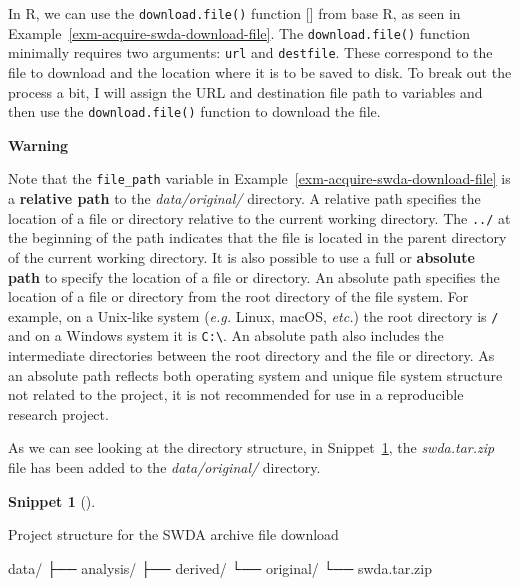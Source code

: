 \documentclass[
  letterpaper,
  krantz1]{latex/krantz-mod}
\newenvironment{Shaded}{\begin{snugshade}}{\end{snugshade}}
\newcommand{\ExtensionTok}[1]{\textcolor[rgb]{0.00,0.00,0.00}{#1}}
\newcommand{\NormalTok}[1]{\textcolor[rgb]{0.00,0.00,0.00}{#1}}
\newcommand{\cindex}[1]{%
  \StrSubstitute{#1}{_}{\_}[\temp]%
  \index{\temp}%
}
\theoremstyle{definition}
\newtheorem{definition}{Snippet}[chapter]
\theoremstyle{definition}
\theoremstyle{remark}
\begin{document}
In R, we can use the \texttt{download.file()}
function\cindex{download.file()} from base R, as seen in
Example~\ref{exm-acquire-swda-download-file}. The
\texttt{download.file()} function minimally requires two arguments:
\texttt{url} and \texttt{destfile}. These correspond to the file to
download and the location where it is to be saved to disk. To break out
the process a bit, I will assign the URL and destination file path to
variables and then use the \texttt{download.file()} function to download
the file.

\begin{tcolorbox}[enhanced jigsaw, toprule=.15mm, breakable, colback=white, arc=.35mm, left=2mm, colframe=quarto-callout-color-frame, opacityback=0, bottomrule=.15mm, rightrule=.15mm, leftrule=.75mm]

\textbf{ Warning}

Note that the \texttt{file\_path} variable in
Example~\ref{exm-acquire-swda-download-file} is a \textbf{relative
path} to the \emph{data/original/} directory. A
relative path specifies the location of a file or directory relative to
the current working directory. The \texttt{../} at the beginning of the
path indicates that the file is located in the parent directory of the
current working directory. It is also possible to use a full or
\textbf{absolute path} to specify the location of a
file or directory. An absolute path specifies the location of a file or
directory from the root directory of the file system. For example, on a
Unix-like system (\emph{e.g.} Linux, macOS, \emph{etc.}) the root
directory is \texttt{/} and on a Windows system it is
\texttt{C:\textbackslash{}}. An absolute path also includes the
intermediate directories between the root directory and the file or
directory. As an absolute path reflects both operating system and unique
file system structure not related to the project, it is not recommended
for use in a reproducible research project.

\end{tcolorbox}

As we can see looking at the directory structure, in
Snippet~\ref{def-acquire-swda-download-location}, the
\emph{swda.tar.zip} file has been added to the \emph{data/original/}
directory.

\begin{definition}[]\protect\hypertarget{def-acquire-swda-download-location}{}\label{def-acquire-swda-download-location}

Project structure for the SWDA archive file download

\begin{Shaded}
\begin{Highlighting}[]
\ExtensionTok{data/}
\ExtensionTok{├──}\NormalTok{ analysis/}
\ExtensionTok{├──}\NormalTok{ derived/}
\ExtensionTok{└──}\NormalTok{ original/}
    \ExtensionTok{└──}\NormalTok{ swda.tar.zip}
\end{Highlighting}
\end{Shaded}

\end{definition}
\end{document}
